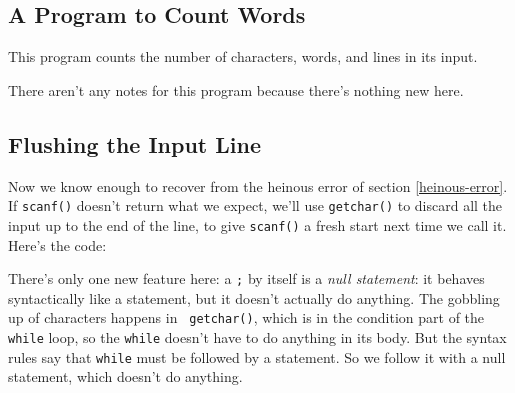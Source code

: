 \subsection{A Program to Count Words}

This program counts the number of characters, words, and lines in its input.



There aren't any notes for this program because there's nothing new here.

\subsection{Flushing the Input Line}

Now we know enough to recover from the heinous error of section
\ref{heinous-error}.  If {\tt scanf()} doesn't return what we expect,
we'll use {\tt getchar()} to discard all the input up to the end of the
line, to give {\tt scanf()} a fresh start next time we call it.  Here's
the code:



There's only one new feature here: a {\tt ;} by itself is a {\em null
statement}\/: it behaves syntactically like a statement, but it doesn't
actually do anything.  The gobbling up of characters happens in {\tt
getchar()}, which is in the condition part of the {\tt while} loop, so
the {\tt while} doesn't have to do anything in its body.  But the syntax
rules say that {\tt while} must be followed by a statement.  So we
follow it with a null statement, which doesn't do anything.


